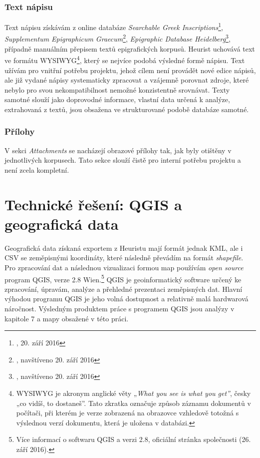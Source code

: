 \subsubsection[text-nápisu]{Text nápisu}

Text nápisu získávám z online databáze {\em Searchable Greek Inscriptions}\footnote{\from[url5], 20. září 2016}, {\em Supplementum Epigraphicum Graecum}\footnote{\from[url6], navštíveno 20. září 2016}, {\em Epigraphic Database Heidelberg}\footnote{\from[url7], navštíveno 20. září 2016}, případně manuálním přepisem textů epigrafických korpusů. Heurist uchovává text ve formátu WYSIWYG\footnote{WYSIWYG je akronym anglické věty „{\em What you see is what you get”}, česky „co vidíš, to dostaneš”. Tato zkratka označuje způsob záznamu dokumentů v počítači, při kterém je verze zobrazená na obrazovce vzhledově totožná s výslednou verzí dokumentu, která je uložena v databázi.}, který se nejvíce podobá výsledné formě nápisu. Text užívám pro vnitřní potřebu projektu, jehož cílem není provádět nové edice nápisů, ale již vydané nápisy systematicky zpracovat a vzájemně porovnat zdroje, které nebylo pro svou nekompatibilnost nemožné konzistentně srovnávat. Texty samotné slouží jako doprovodné informace, vlastní data určená k analýze, extrahovaná z textů, jsou obsažena ve strukturované podobě databáze samotné.

\subsubsection[přílohy]{Přílohy}

V sekci {\em Attachments} se nacházejí obrazové přílohy tak, jak byly otištěny v jednotlivých korpusech. Tato sekce slouží čistě pro interní potřebu projektu a není zcela kompletní.

\section[technické-řešení-qgis-a-geografická-data]{Technické řešení: QGIS a geografická data}

Geografická data získaná exportem z Heuristu mají formát jednak KML, ale i CSV se zeměpisnými koordináty, které následně převádím na formát {\em shapefile}. Pro zpracování dat a následnou vizualizaci formou map používám {\em open source} program QGIS, verze 2.8 Wien.\footnote{Více informací o softwaru QGIS a verzi 2.8, oficiální stránka společnosti \from[url8] (26. září 2016).} QGIS je geoinformatický software určený ke zpracování, úpravám, analýze a přehledné prezentaci zeměpisných dat. Hlavní výhodou programu QGIS je jeho volná dostupnost a relativně malá hardwarová náročnost. Výsledným produktem práce s programem QGIS jsou analýzy v kapitole 7 a mapy obsažené v této práci.

